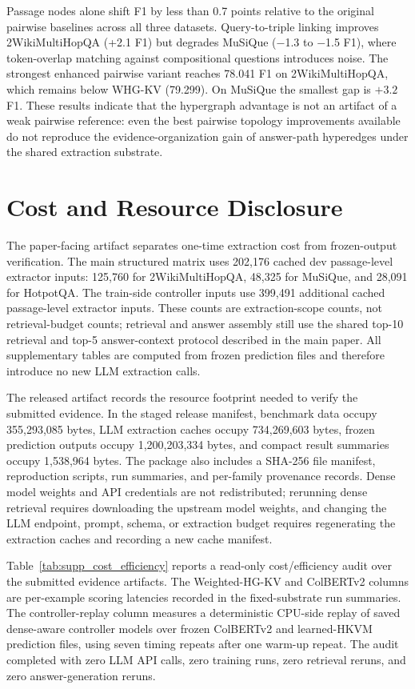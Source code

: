 \documentclass[conference]{IEEEtran}
\newcommand{\whg}{Weighted-HG-KV}
\begin{document}
Passage nodes alone shift F1 by less than 0.7 points relative to the original pairwise baselines across all three datasets. Query-to-triple linking improves 2WikiMultiHopQA (+2.1 F1) but degrades MuSiQue ($-$1.3 to $-$1.5 F1), where token-overlap matching against compositional questions introduces noise. The strongest enhanced pairwise variant reaches 78.041 F1 on 2WikiMultiHopQA, which remains below WHG-KV (79.299). On MuSiQue the smallest gap is $+3.2$ F1. These results indicate that the hypergraph advantage is not an artifact of a weak pairwise reference: even the best pairwise topology improvements available do not reproduce the evidence-organization gain of answer-path hyperedges under the shared extraction substrate.

\section{Cost and Resource Disclosure}

The paper-facing artifact separates one-time extraction cost from frozen-output verification. The main structured matrix uses 202,176 cached dev passage-level extractor inputs: 125,760 for 2WikiMultiHopQA, 48,325 for MuSiQue, and 28,091 for HotpotQA. The train-side controller inputs use 399,491 additional cached passage-level extractor inputs. These counts are extraction-scope counts, not retrieval-budget counts; retrieval and answer assembly still use the shared top-10 retrieval and top-5 answer-context protocol described in the main paper. All supplementary tables are computed from frozen prediction files and therefore introduce no new LLM extraction calls.

The released artifact records the resource footprint needed to verify the submitted evidence. In the staged release manifest, benchmark data occupy 355,293,085 bytes, LLM extraction caches occupy 734,269,603 bytes, frozen prediction outputs occupy 1,200,203,334 bytes, and compact result summaries occupy 1,538,964 bytes. The package also includes a SHA-256 file manifest, reproduction scripts, run summaries, and per-family provenance records. Dense model weights and API credentials are not redistributed; rerunning dense retrieval requires downloading the upstream model weights, and changing the LLM endpoint, prompt, schema, or extraction budget requires regenerating the extraction caches and recording a new cache manifest.

Table~\ref{tab:supp_cost_efficiency} reports a read-only cost/efficiency audit over the submitted evidence artifacts. The \whg{} and ColBERTv2 columns are per-example scoring latencies recorded in the fixed-substrate run summaries. The controller-replay column measures a deterministic CPU-side replay of saved dense-aware controller models over frozen ColBERTv2 and learned-HKVM prediction files, using seven timing repeats after one warm-up repeat. The audit completed with zero LLM API calls, zero training runs, zero retrieval reruns, and zero answer-generation reruns.
\end{document}
